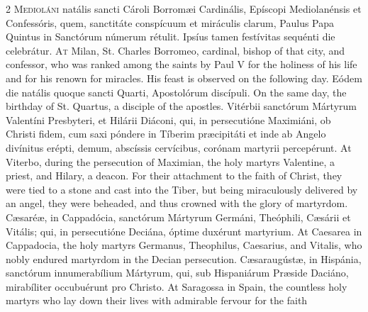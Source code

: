 \begin{paracol}{2}
{}
	\lettrine[lines=2]{M}{edioláni} natális sancti Cároli Borromæi Cardinális,
	Epíscopi Mediolanénsis et Confessóris, quem, sanctitáte conspícuum et
	miráculis clarum, Paulus Papa Quintus in Sanctórum númerum rétulit. Ipsíus
	tamen festívitas sequénti die celebrátur.
\switchcolumn
{}
	\lettrine[lines=2]{A}{t} Milan, St. Charles Borromeo, cardinal, bishop of
	that city, and confessor, who was ranked among the saints by Paul V for the
	holiness of his life and for his renown for miracles. His feast is observed
	on the following day.
\switchcolumn*
{}
Eódem die natális 
 quoque sancti Quarti, Apostolórum discípuli.
\switchcolumn
{}
On the same day, the birthday of St. 
 Quartus, a disciple of the apostles.
\switchcolumn*
{}
Vitérbii sanctórum 
 Mártyrum Valentíni Presbyteri, et Hilárii Diáconi, qui, in persecutióne 
 Maximiáni, ob Christi fidem, cum saxi póndere in Tíberim præcipitáti et inde 
 ab Angelo divínitus erépti, demum, abscíssis cervícibus, corónam martyrii 
 percepérunt.
\switchcolumn
{}
At Viterbo, during the persecution 
 of Maximian, the holy martyrs Valentine, a priest, and Hilary, a deacon. 
 For their attachment to the faith of Christ, they were tied to a stone and 
 cast into the Tiber, but being miraculously delivered by an angel, they were 
 beheaded, and thus crowned with the glory of martyrdom.
\switchcolumn*
{}
Cæsaréæ, in Cappadócia, sanctórum Mártyrum Germáni, Theóphili, Cæsárii et Vitális; qui, in 
 persecutióne Deciána, óptime duxérunt martyrium.
\switchcolumn
{}
At Caesarea in Cappadocia, the holy 
 martyrs Germanus, Theophilus, Caesarius, and Vitalis, who nobly endured 
 martyrdom in the Decian persecution.
\switchcolumn*
{}
Cæsaraugústæ, in 
 Hispánia, sanctórum innumerabílium Mártyrum, qui, sub Hispaniárum Præside 
 Daciáno, mirabíliter occubuérunt pro Christo.
\switchcolumn
{}
At Saragossa in Spain, the countless 
 holy martyrs who lay down their lives with admirable fervour for the faith 

\end{paracol}
